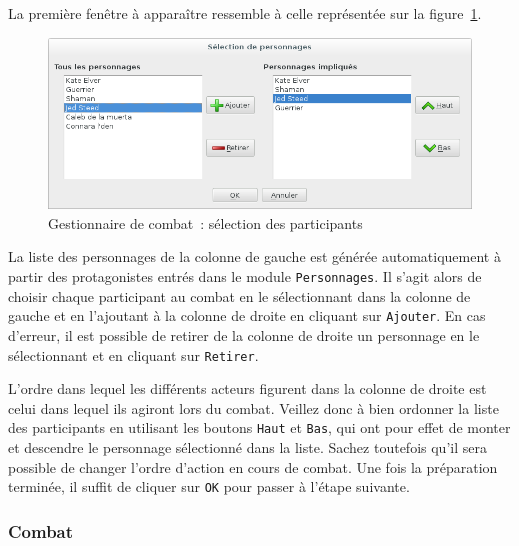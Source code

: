 \documentclass[a4paper,12pt]{article}
\newcommand*{\interfaceitem}[1]{\texttt{#1}}
\begin{document}
La première fenêtre à apparaître ressemble à celle représentée sur la figure~\ref{gestion_combat_choix}.
\begin{figure}[ht]
    \centerline{\includegraphics[width=1\textwidth]{gestionnaire_combat_prep}}
    \caption{Gestionnaire de combat~: sélection des participants}
    \label{gestion_combat_choix}
\end{figure}
La liste des personnages de la colonne de gauche est générée automatiquement à partir des protagonistes entrés dans le module \interfaceitem{Personnages}.
Il s'agit alors de choisir chaque participant au combat en le sélectionnant dans la colonne de gauche et en l'ajoutant à la colonne de droite en cliquant sur \interfaceitem{Ajouter}.
En cas d'erreur, il est possible de retirer de la colonne de droite un personnage en le sélectionnant et en cliquant sur \interfaceitem{Retirer}.

L'ordre dans lequel les différents acteurs figurent dans la colonne de droite est celui dans lequel ils agiront lors du combat.
Veillez donc à bien ordonner la liste des participants en utilisant les boutons \interfaceitem{Haut} et \interfaceitem{Bas}, qui ont pour effet de monter et descendre le personnage sélectionné dans la liste.
Sachez toutefois qu'il sera possible de changer l'ordre d'action en cours de combat.
Une fois la préparation terminée, il suffit de cliquer sur \interfaceitem{OK} pour passer à l'étape suivante.

\subsubsection{Combat}
\end{document}
